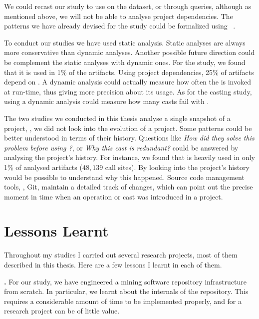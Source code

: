 We could recast our \unsafe{} study to use \boa{} on the \github{} dataset,
or \lgtm{} through \ql{} queries, although as mentioned above,
we will not be able to analyse project dependencies.
The patterns we have already devised for the \unsafe{} study could be formalized using \ql{}~\citep{avgustinovQLObjectorientedQueries2016}.

To conduct our studies we have used static analysis.
Static analyses are always more conservative than dynamic analyses.
Another possible future direction could be complement the static analyses with dynamic ones.
For the \unsafe{} study,
we found that it is used in 1\% of the \mavencentral{} artifacts.
Using project dependencies, 25\% of artifacts depend on \smu{}.
A dynamic analysis could actually measure how often the \unsafe{} \api{} is invoked at run-time,
thus giving more precision about its usage.
As for the casting study,
using a dynamic analysis could measure how many casts fail with .

The two studies we conducted in this thesis analyse a single snapshot of a project,
\ie{}, we did not look into the evolution of a project.
Some patterns could be better understood in terms of their history.
Questions like
\emph{How did they solve this problem before using \unsafe{}?},
or \emph{Why this cast is redundant?}
could be answered by analysing the project's history. 
For instance,
we found that \smu{} is heavily used in only 1\% of analysed artifacts
($48,139$ call sites).
By looking into the project's history would be possible to understand why this happened.
Source code management tools, \eg{}, Git,
maintain a detailed track of changes,
which can point out the precise moment in time when an \unsafe{} operation or cast was introduced in a project.

\section{Lessons Learnt}

Throughout my \phd{} studies I carried out several research projects,
most of them described in this thesis.
Here are a few lessons I learnt in each of them.

\textbf{\unsafe{} \api{}.}
For our \unsafe{} study,
we have engineered a mining software repository infrastructure from scratch.
In particular,
we learnt about the internals of the \mavencentral{} repository.
This requires a considerable amount of time to be implemented properly,
and for a research project can be of little value.

